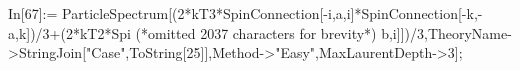 In[67]:= ParticleSpectrum[(2*kT3*SpinConnection[-i,a,i]*SpinConnection[-k,-a,k])/3+(2*kT2*Spi (*omitted 2037 characters for brevity*) b,i]])/3,TheoryName->StringJoin["Case",ToString[25]],Method->"Easy",MaxLaurentDepth->3];